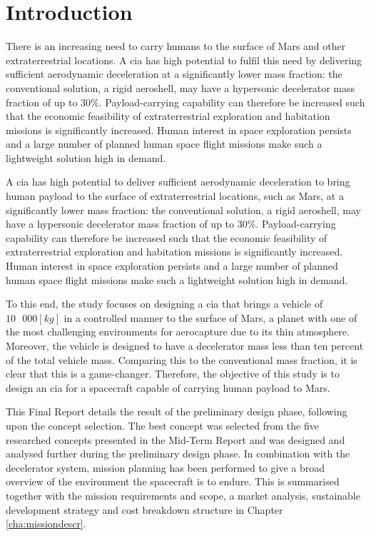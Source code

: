 \section{Introduction}
\label{cha:introduction}
There is an increasing need to carry humans to the surface of Mars and other extraterrestrial locations. A \gls{cia} has high potential to fulfil this need by delivering sufficient aerodynamic deceleration at a significantly lower mass fraction: the conventional solution, a rigid aeroshell, may have a hypersonic decelerator mass fraction of up to $30\%$. Payload-carrying capability can therefore be increased such that the economic feasibility of extraterrestrial exploration and habitation missions is significantly increased. Human interest in space exploration persists and a large number of planned human space flight missions make such a lightweight solution high in demand. 

A \gls{cia} has high potential to deliver sufficient aerodynamic deceleration to bring human payload to the surface of extraterrestrial locations, such as Mars, at a significantly lower mass fraction: the conventional solution, a rigid aeroshell, may have a hypersonic decelerator mass fraction of up to $30\%$. Payload-carrying capability can therefore be increased such that the economic feasibility of extraterrestrial exploration and habitation missions is significantly increased. Human interest in space exploration persists and a large number of planned human space flight missions make such a lightweight solution high in demand. 

To this end, the study focuses on designing a \gls{cia} that brings a vehicle of $10\mbox{ }000 [kg]$ in a controlled manner to the surface of Mars, a planet with one of the most challenging environments for aerocapture due to its thin atmosphere. Moreover, the vehicle is designed to have a decelerator mass less than ten percent of the total vehicle mass. Comparing this to the conventional mass fraction, it is clear that this is a game-changer. Therefore, the objective of this study is to design an \gls{cia} for a spacecraft capable of carrying human payload to Mars.

This Final Report details the result of the preliminary design phase, following upon the concept selection. The best concept was selected from the five researched concepts presented in the Mid-Term Report and was designed and analysed further during the preliminary design phase. In combination with the decelerator system, mission planning has been performed to give a broad overview of the environment the spacecraft is to endure. This is summarised together with the mission requirements and scope, a market analysis, sustainable development strategy and cost breakdown structure in Chapter \ref{cha:missiondescr}.

